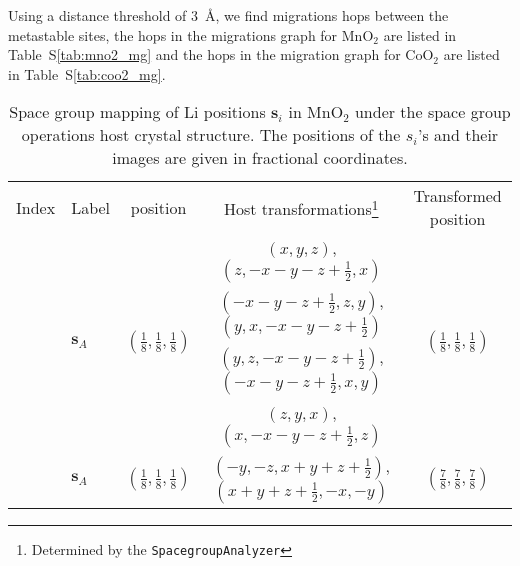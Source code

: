 \documentclass[reprint,preprintnumbers,amsmath,amssymb,aps,prl]{revtex4-1}
\begin{document}
Using a distance threshold of 3~\AA{}, we find migrations hops between the metastable sites, the hops in the migrations graph for MnO$_2$ are listed in Table~S\ref{tab:mno2_mg} and the hops in the migration graph for CoO$_2$ are listed in Table~S\ref{tab:coo2_mg}.




\newpage

%
\begin{table*}[h]
    \caption{\label{tab:li_positions}%
        Space group mapping of Li positions $\mathbf{s}_i$ in MnO$_2$ under the space group operations host crystal structure.  The positions of the $s_i$'s and their images are given in fractional coordinates.
    }
    \begin{ruledtabular}
        \begin{tabular}{clccc}
            Index & Label                      & position                                                   & Host transformations\footnote{Determined by the \texttt{SpacegroupAnalyzer}} & Transformed position                                                      \\
            \colrule
            \multirow{4}{*}{0} &\multirow{4}{*}{$\mathbf{s}_A$} & \multirow{4}{*}{$\left(\frac{1}{8},\frac{1}{8},\frac{1}{8}\right)$} & $(x, y, z)$, $(z, -x-y-z+\frac{1}{2}, x)$                                   & \multirow{4}{*}{$\left(\frac{1}{8},\frac{1}{8},\frac{1}{8}\right)$} \\
                                            & &                                                                     & $(-x-y-z+\frac{1}{2}, z, y)$, $(y, x, -x-y-z+\frac{1}{2})$                  &                                                                     \\
                                            & &                                                                     & $(y, z, -x-y-z+\frac{1}{2})$, $(-x-y-z+\frac{1}{2}, x, y)$                  &                                                                     \\
                                            & &                                                                     & $(z, y, x)$, $(x, -x-y-z+\frac{1}{2}, z)$                                   &                                                                     \\
            \colrule
            \multirow{4}{*}{1} &\multirow{4}{*}{$\mathbf{s}_A$} & \multirow{4}{*}{$\left(\frac{1}{8},\frac{1}{8},\frac{1}{8}\right)$} & $(-y, -z, x+y+z+\frac{1}{2})$, $(x+y+z+\frac{1}{2}, -x, -y)$                & \multirow{4}{*}{$\left(\frac{7}{8},\frac{7}{8},\frac{7}{8}\right)$} \\

\end{tabular}
\end{ruledtabular}
\end{table*}
\end{document}
